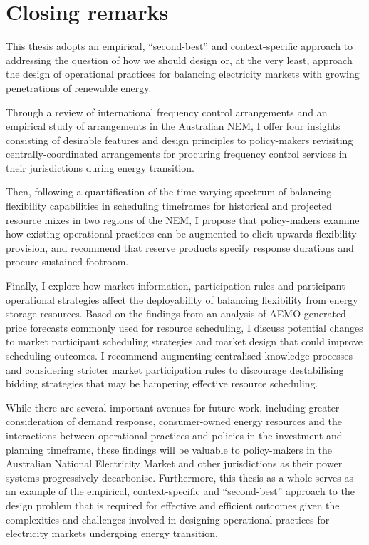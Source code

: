 \documentclass[12pt,a4paper,]{report}
\begin{document}
\hypertarget{sec:conclusion-closing_remarks}{%
\section{Closing remarks}\label{sec:conclusion-closing_remarks}}

This thesis adopts an empirical, ``second-best'' and context-specific
approach to addressing the question of how we should design or, at the
very least, approach the design of operational practices for balancing
electricity markets with growing penetrations of renewable energy.

Through a review of international frequency control arrangements and an
empirical study of arrangements in the Australian NEM, I offer four
insights consisting of desirable features and design principles to
policy-makers revisiting centrally-coordinated arrangements for
procuring frequency control services in their jurisdictions during
energy transition.

Then, following a quantification of the time-varying spectrum of
balancing flexibility capabilities in scheduling timeframes for
historical and projected resource mixes in two regions of the NEM, I
propose that policy-makers examine how existing operational practices
can be augmented to elicit upwards flexibility provision, and recommend
that reserve products specify response durations and procure sustained
footroom.

Finally, I explore how market information, participation rules and
participant operational strategies affect the deployability of balancing
flexibility from energy storage resources. Based on the findings from an
analysis of AEMO-generated price forecasts commonly used for resource
scheduling, I discuss potential changes to market participant scheduling
strategies and market design that could improve scheduling outcomes. I
recommend augmenting centralised knowledge processes and considering
stricter market participation rules to discourage destabilising bidding
strategies that may be hampering effective resource scheduling.

While there are several important avenues for future work, including
greater consideration of demand response, consumer-owned energy
resources and the interactions between operational practices and
policies in the investment and planning timeframe, these findings will
be valuable to policy-makers in the Australian National Electricity
Market and other jurisdictions as their power systems progressively
decarbonise. Furthermore, this thesis as a whole serves as an example of
the empirical, context-specific and ``second-best'' approach to the
design problem that is required for effective and efficient outcomes
given the complexities and challenges involved in designing operational
practices for electricity markets undergoing energy transition.
\end{document}
